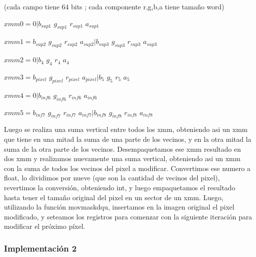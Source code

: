 \documentclass[a4paper]{article}
\begin{document}
\vspace*{0.3cm}

(cada campo tiene 64 bits ; cada componente r,g,b,a tiene tamaño word)

\vspace*{0.3cm}
$xmm0=  0|b_{sup1}$ $g_{sup1}$ $r_{sup1}$ $a_{sup1}$ 

\vspace*{0.3cm}

$xmm1=  b_{sup2}$ $g_{sup2}$ $r_{sup2}$ $a_{sup2}|b_{sup3}$ $g_{sup3}$ $r_{sup3}$ $a_{sup3}$  

\vspace*{0.3cm}

$xmm2=  0         |b_{4}$ $g_{4}$ $r_{4}$ $a_{4}$

\vspace*{0.3cm}

$xmm3=  b_{pixel}$ $g_{pixel}$ $r_{pixel}$ $a_{pixel}     |b_{5}$ $g_{5}$ $r_{5}$ $a_{5}$

\vspace*{0.3cm}

$xmm4=  0         |b_{inf6}$ $g_{inf6}$ $r_{inf6}$ $a_{inf6} $ 

\vspace*{0.3cm}

$xmm5=  b_{inf7}$ $g_{inf7}$ $r_{inf7}$ $a_{inf7}|b_{inf8}$ $g_{inf8}$ $r_{inf8}$ $a_{inf8}$

\vspace*{0.3cm}

Luego se realiza una suma vertical entre todos los xmm, obteniendo asi un xmm que tiene en una mitad la suma de una parte de los vecinos, y en la otra mitad la suma de la otra parte de los vecinos. Desempaquetamos ese xmm resultado en dos xmm y realizamos nuevamente una suma vertical, obteniendo asi un xmm con la suma de todos los vecinos del pixel a modificar. Convertimos ese numero a float, lo dividimos por nueve (que son la cantidad de vecinos del pixel), revertimos la conversión, obteniendo int, y luego empaquetamos el resultado hasta tener el tamaño original del pixel en un sector de un xmm. Luego, utilizando la función movmaskdqu, insertamos en la imagen original el pixel modificado, y seteamos los registros para comenzar con la siguiente iteración para modificar el próximo píxel.  

\subsubsection{Implementación 2}
\end{document}

